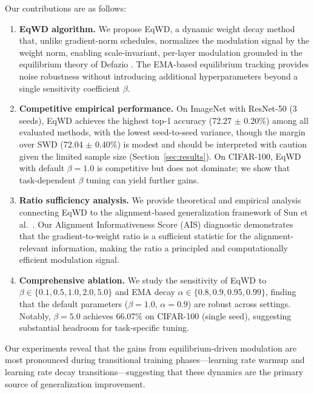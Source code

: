 \documentclass{article}
\begin{document}
Our contributions are as follows:

\begin{enumerate}
\item
  \textbf{EqWD algorithm.} We propose EqWD, a dynamic weight decay
  method that, unlike gradient-norm schedules, normalizes the modulation
  signal by the weight norm, enabling scale-invariant, per-layer
  modulation grounded in the equilibrium theory of Defazio
  \citep{defazio2025}. The EMA-based equilibrium tracking provides noise
  robustness without introducing additional hyperparameters beyond a
  single sensitivity coefficient $\beta$.
\item
  \textbf{Competitive empirical performance.} On ImageNet with ResNet-50
  (3 seeds), EqWD achieves
  the highest top-1 accuracy (72.27 $\pm$ 0.20\%) among all evaluated
  methods, with the lowest seed-to-seed variance, though the margin over
  SWD (72.04 $\pm$ 0.40\%) is modest and should be interpreted with
  caution given the limited sample size (Section~\ref{sec:results}). On CIFAR-100,
  EqWD with default $\beta = 1.0$ is competitive but does not
  dominate; we show that task-dependent $\beta$ tuning can yield
  further gains.
\item
  \textbf{Ratio sufficiency analysis.} We provide theoretical and
  empirical analysis connecting EqWD to the alignment-based
  generalization framework of Sun et al.~\citep{sun2025cvpr}. Our
  Alignment Informativeness Score (AIS) diagnostic demonstrates that the
  gradient-to-weight ratio is a sufficient statistic for the
  alignment-relevant information, making the ratio a principled and
  computationally efficient modulation signal.
\item
  \textbf{Comprehensive ablation.} We study the sensitivity of EqWD to
  $\beta \in \{0.1, 0.5, 1.0, 2.0, 5.0\}$ and EMA decay
  $\alpha \in \{0.8, 0.9, 0.95, 0.99\}$, finding that the default
  parameters ($\beta = 1.0$, $\alpha = 0.9$) are robust across
  settings. Notably, $\beta = 5.0$ achieves 66.07\% on CIFAR-100
  (single seed), suggesting substantial headroom for task-specific
  tuning.
\end{enumerate}

Our experiments reveal that the gains from equilibrium-driven modulation
are most pronounced during transitional training phases---learning rate
warmup and learning rate decay transitions---suggesting that these dynamics are
the primary source of generalization improvement.


\end{document}
